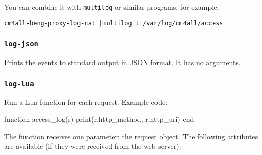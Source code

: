 \documentclass[a4paper,12pt]{article}
\begin{document}
You can combine it with \texttt{multilog} or similar programs, for
example:

\begin{verbatim}
cm4all-beng-proxy-log-cat |multilog t /var/log/cm4all/access
\end{verbatim}

\subsubsection{\texttt{log-json}}

Prints the events to standard output in JSON format.  It has no
arguments.

\subsubsection{\texttt{log-lua}}

Run a Lua function for each request.  Example code:

\begin{verbatim*}
function access_log(r)
   print(r.http_method, r.http_uri)
end
\end{verbatim*}

The function receives one parameter: the request object.  The
following attributes are available (if they were received from the web
server):
\end{document}
